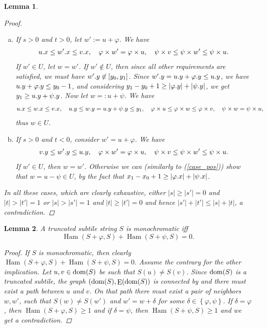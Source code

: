 \documentclass[11pt, letterpaper]{article}
\theoremstyle{plain}
\newtheorem{lemma}{Lemma}
\theoremstyle{definition}
\theoremstyle{remark}
\renewcommand{\phi}{\varphi}
\newcommand{\set}[1]{\left\lbrace #1 \right\rbrace}
\newcommand{\eq}[1]{\begin{align*} #1 \end{align*}}
\DeclareMathOperator*{\Edges}{E}
\DeclareMathOperator*{\Ham}{Ham}
\newcommand{\absolute}[1]{\left\lvert#1\right\rvert}
\begin{document}
\begin{lemma}
\begin{proof}
\begin{enumerate}[(a)]
			\item If $s > 0$ and $t > 0$, let $w' := u + \phi$. \label{case_pos}
				We have \eq{
					\x{u} \le \x{w'} \le \x{v}, \quad \h{w'} = \h{u}, \quad \s{v} \le \s{w'} \le \s{u}.
				}
				If $w' \in U$, let $w = w'$.
				If $w' \not \in U$, then since all other requirements are satisfied, we must have $w'.y \not \in [y_0, y_1]$.
				Since $\y{w'} = \y{u} + \y{\phi} \le \y{u}$, we have $\y{u} + \y{\phi} \le y_0 - 1$, and
				considering $y_1 - y_0 + 1 \ge \absolute{\y{\phi}} + \absolute{\y{\psi}}$, we get $y_1 \ge u.y + \psi.y$.
				Now let $w =: u + \psi$.
				We have \eq{
					\x{u} \le \x{w} \le \x{v}, \quad \y{u} \le \y{w} = \y{u} + \y{\psi} \le y_1, \quad \h{u} \le \h{w} \le \h{v}, \quad \s{w} = \s{u},
				}
				thus $w \in U$.
			\item If $s > 0$ and $t < 0$, consider $w' = u + \phi$.
				We have \eq{
					\y{v} \le \y{w'} \le \y{u}, \quad \h{w'} = \h{u}, \quad \s{v} \le \s{w'} \le \s{u}.
				}
				If $w' \in U$, then $w = w'$.
				Otherwise we can (similarly to (\ref{case_pos})) show that $w = u - \psi \in U$, by the fact that $x_1 - x_0 + 1 \ge \absolute{\x{\phi}} + \absolute{\x{\psi}}$. 
		\end{enumerate}
		In all these cases, which are clearly exhaustive, either $\absolute{s} \ge \absolute{s'} = 0$ and $\absolute{t} > \absolute{t'} = 1$ or $\absolute{s} > \absolute{s'} = 1$ and $\absolute{t} \ge \absolute{t'} = 0$ and hence $\absolute{s'}+\absolute{t'} \le \absolute{s}+\absolute{t}$, a contradiction. 
	\end{proof}
\end{lemma}




\begin{lemma}\label{monochromacy_condition}
	A truncated subtile string $S$ is monochromatic iff
	\[\Ham(S + \phi, S) + \Ham(S + \psi, S) = 0.\]
	\begin{proof}
		If $S$ is monochromatic, then clearly $\Ham(S + \phi, S) + \Ham(S + \psi, S) = 0$.
		Assume the contrary for the other implication.
		Let $u, v \in \operatorname*{dom}(S)$ be such that $S(u) \neq S(v)$.
		Since $\operatorname*{dom}(S)$ is a truncated subtile, the graph $(\d{S}, \Edges(\d{S})$ is connected by  and there must exist a path between $u$ and $v$.
		On that path there must exist a pair of neighbors $w, w'$, such that $S(w) \neq S(w')$ and $w' = w + \delta$ for some $\delta \in \set{\phi, \psi}$.
		If $\delta = \phi$, then $\Ham(S + \phi, S) \ge 1$ and if $\delta = \psi$, then $\Ham(S + \psi, S) \ge 1$ and we get a contradiction.
	\end{proof}
\end{lemma}
\end{document}
